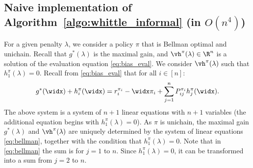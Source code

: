 \subsection{Naive implementation of Algorithm~\ref{algo:whittle_informal} \texorpdfstring{(in $O(n^4)$)}{}}
\label{ssec:implem}

For a given penalty $\lambda$, we consider a policy $\pi$ that is Bellman optimal and unichain. Recall that $g^{*}(\lambda)$ is the maximal gain, and $\vh^{\pi}(\lambda)\in\R^n$ is a solution of the evaluation equation \eqref{eq:bias_eval}.
We consider $\vh^{\pi}(\lambda)$ such that $h^\pi_1(\lambda)=0$.
Recall from \eqref{eq:bias_eval} that for all $i\in[n]:$
\begin{align}
    \label{eq:bellman}
    g^*(\widx) + h^{\pi}_i(\widx) = r_i^{\pi_i} -\widx\pi_i + \sum_{j=1}^nP^{\pi_i}_{ij}h^{\pi}_j(\widx).
\end{align}
The above system is a system of $n+1$ linear equations with $n+1$ variables (the additional equation begins with $h_1^\pi(\lambda)=0$).
As $\pi$ is unichain, the maximal gain $g^*(\lambda)$ and $\vh^\pi(\lambda)$ are uniquely determined by the system of linear equations \eqref{eq:bellman}, together with the condition that $h_1^\pi(\lambda)=0$.
Note that in \eqref{eq:bellman} the sum is for $j=1$ to $n$.
Since $h_1^\pi(\lambda)=0$, it can be transformed into a sum from $j=2$ to $n$. 

